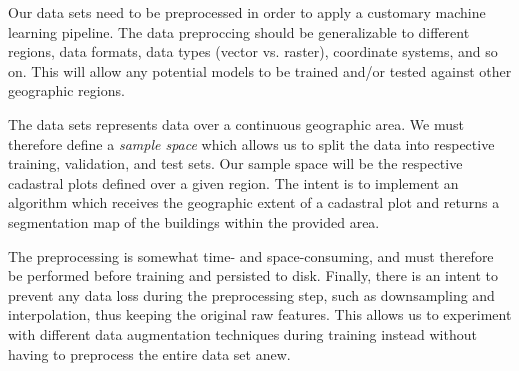 Our data sets need to be preprocessed in order to apply a customary machine learning pipeline.
The data preproccing should be generalizable to different regions, data formats, data types (vector vs. raster), coordinate systems, and so on.
This will allow any potential models to be trained and/or tested against other geographic regions.

The data sets represents data over a continuous geographic area.
We must therefore define a \textit{sample space} which allows us to split the data into respective training, validation, and test sets.
Our sample space will be the respective cadastral plots defined over a given region.
The intent is to implement an algorithm which receives the geographic extent of a cadastral plot and returns a segmentation map of the buildings within the provided area.

The preprocessing is somewhat time- and space-consuming, and must therefore be performed before training and persisted to disk.
Finally, there is an intent to prevent any data loss during the preprocessing step, such as downsampling and interpolation, thus keeping the original raw features.
This allows us to experiment with different data augmentation techniques during training instead without having to preprocess the entire data set anew.
